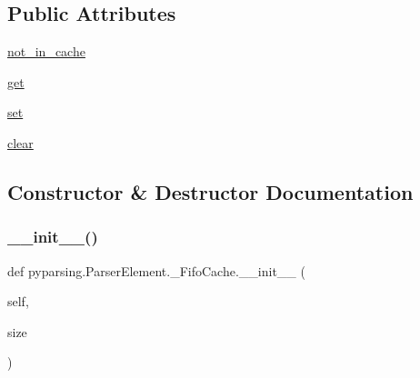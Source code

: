\subsection*{Public Attributes}
\begin{DoxyCompactItemize}
\item 
\hyperlink{classpyparsing_1_1ParserElement_1_1__FifoCache_a1d4ba669f4d51444b40796201ab0bca3}{not\+\_\+in\+\_\+cache}
\item 
\hyperlink{classpyparsing_1_1ParserElement_1_1__FifoCache_a9b91edecfeb221e20e96bb87f82a6e1c}{get}
\item 
\hyperlink{classpyparsing_1_1ParserElement_1_1__FifoCache_af14e05835b096c368819202284105f3f}{set}
\item 
\hyperlink{classpyparsing_1_1ParserElement_1_1__FifoCache_ab3754ae98aad78aba6dad548f524af91}{clear}
\end{DoxyCompactItemize}


\subsection{Constructor \& Destructor Documentation}
\mbox{\label{classpyparsing_1_1ParserElement_1_1__FifoCache_ad5509dbec9717c17e99ae33657c22cce}} 
\subsubsection{\texorpdfstring{\+\_\+\+\_\+init\+\_\+\+\_\+()}{\_\_init\_\_()}\hspace{0.1cm}{\footnotesize\ttfamily [1/2]}}
{\footnotesize\ttfamily def pyparsing.\+Parser\+Element.\+\_\+\+Fifo\+Cache.\+\_\+\+\_\+init\+\_\+\+\_\+ (\begin{DoxyParamCaption}\item[{}]{self,  }\item[{}]{size }\end{DoxyParamCaption})}

\mbox{\label{classpyparsing_1_1ParserElement_1_1__FifoCache_ad5509dbec9717c17e99ae33657c22cce}} 
